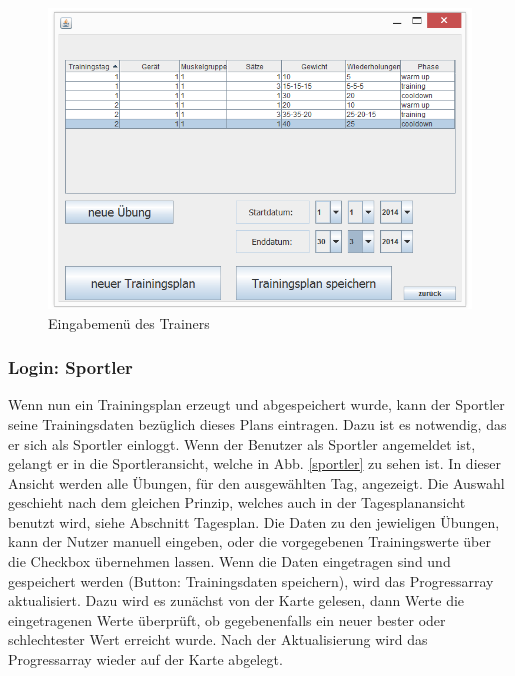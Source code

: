 \begin{figure}[h]
\includegraphics[width=1\hsize]{./images/Trainer.png}
\caption{Eingabemenü des Trainers}
\label{trainer}
\end{figure}


\newpage
\subsubsection*{Login: Sportler}

Wenn nun ein Trainingsplan erzeugt und abgespeichert wurde, kann der Sportler seine Trainingsdaten bezüglich dieses Plans eintragen. Dazu ist es notwendig, das er sich als Sportler einloggt. Wenn der Benutzer als Sportler angemeldet ist, gelangt er in die Sportleransicht, welche in Abb. \ref{sportler} zu sehen ist. In dieser Ansicht werden alle Übungen, für den ausgewählten Tag, angezeigt. Die Auswahl geschieht nach dem gleichen Prinzip, welches auch in der Tagesplanansicht benutzt wird, siehe Abschnitt Tagesplan. Die Daten zu den jewieligen Übungen, kann der Nutzer manuell eingeben, oder die vorgegebenen Trainingswerte über die Checkbox übernehmen lassen. Wenn die Daten eingetragen sind und gespeichert werden (Button: Trainingsdaten speichern), wird das Progressarray aktualisiert. Dazu wird es zunächst von der Karte gelesen, dann Werte die eingetragenen Werte überprüft, ob gegebenenfalls ein neuer bester oder schlechtester Wert erreicht wurde. Nach der Aktualisierung wird das Progressarray wieder auf der Karte abgelegt. 

